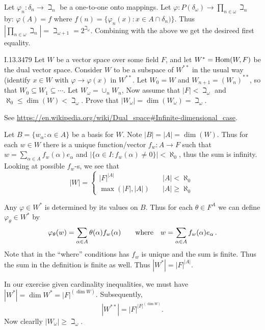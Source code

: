 Let \(\varphi_n: \delta_n \to \beth_n\) be a one-to-one onto mappings.
Let \(\varphi: P(\delta_\omega) \to \prod_{n\in\omega}\beth_n\) by:
\(\varphi(A) = f\) where \(f(n) = \{\varphi_n(x): x\in A\cap \delta_n)\}\).
Thus \(|\prod_{n\in\omega}\beth_n| = \beth_{\omega + 1} = 2^{\beth_\omega}\).
Combining with the above we get the desireed first equality.

\begin{lexcopy}{I.13.34}{79}
Let $W$ be a vector space over some field $F$, and let \(W^* = \operatorname{Hom}(W, F)\)
be the dual vector space. Consider $W$ to be a subspace of \(W^{**}\) in
the usual way (identify \(x \in W\) with
\(\varphi \to \varphi(x)\) in \(W^{**}\). Let \(W_0 = W\) and
\(W_{n+1} = (W_n)^{**}\), so that
\(W_0 \subseteq W_1 \subseteq \cdots\). Let \(W_\omega = \cup_n W_n\),
Now assume that
\(|F| < \beth_\omega\) and \(\aleph_0 \leq \dim(W) < \beth_\omega\).
Prove that \(|W_\omega| = \dim(W_\omega) = \beth_\omega\).
\end{lexcopy}

See \url{https://en.wikipedia.org/wiki/Dual_space#Infinite-dimensional_case}.

Let \(B=\{w_\alpha: \alpha \in A\}\)
be a basis for $W$. Note \(|B|=|A|=\dim(W)\).
Thus for each \(w\in W\)
there is a unique function/vector \(f_w: A \to F\)
such that \(w = \sum_{\alpha\in A} f_w(\alpha)e_\alpha\)
and \hbox{\(|\{\alpha\in I: f_w(\alpha)\neq 0\}| < \aleph_0\)},
thus the sum is infinity.
Looking at possible \(f_w\)-s, we see that
\begin{equation*}
|W| = \left\{
 \begin{array}{ll}
 |F|^{|A|}       &\quad |A| < \aleph_0\\
 \max(|F|, |A|) &\quad |A| \geq \aleph_0
 \end{array}
\right.
\end{equation*}

Any \(\varphi \in W^*\) is determined by its values on $B$.
Thus for each \(\theta \in F^A\) we can define
\(\varphi_\theta \in W^*\) by
\begin{equation*}
\varphi_\theta(w) = \sum_{\alpha \in A} \theta(\alpha)f_w(\alpha)
\qquad \textnormal{where} \quad
w = \sum_{\alpha\in A} f_w(\alpha)e_\alpha\,.
\end{equation*}
Note that in the ``where'' conditions has \(f_w\) is unique
and the sum is finite. Thus the sum in the definition is finite as well.
Thus \(|W^*| = |F|^{|A|}\).

In our exercise given cardinality inequalities, we must have
\(|W^*| = \dim W^* = |F|^{(\dim W)}\).
Subsequently,
\begin{equation*}
|W^{**}| = |F|^{|F|^{(\dim W)}}.
\end{equation*}
Now clearlly \(|W_\omega| \geq \beth_\omega\).

